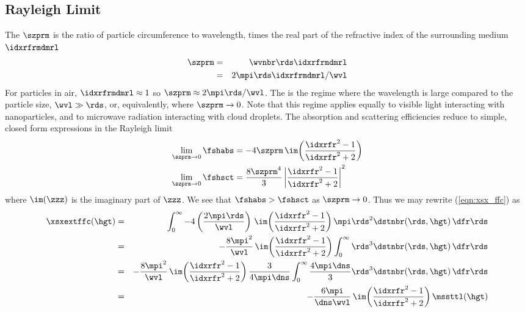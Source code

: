 \documentclass[12pt]{article}
\begin{document}
\subsection[Rayleigh Limit]{Rayleigh Limit}\label{sxn:ryl_lmt}
The  $\szprm$ is the ratio of particle
circumference to wavelength, times the real part of the refractive
index of the surrounding medium $\idxrfrmdmrl$
\begin{eqnarray}
\szprm & = & \wvnbr \rds \idxrfrmdmrl \\
& = & 2 \mpi \rds \idxrfrmdmrl / \wvl
\label{eqn:sz_prm_dfn}
\end{eqnarray}
For particles in air, $\idxrfrmdmrl \approx 1$ so 
$\szprm \approx 2\mpi\rds/\wvl$.
The  is the regime where the wavelength is
large compared to the particle size, $\wvl \gg \rds$, or,
equivalently, where $\szprm \rightarrow 0$.
Note that this regime applies equally to visible light interacting
with nanoparticles, and to microwave radiation interacting with cloud
droplets. 
The absorption and scattering efficiencies reduce to simple, closed
form expressions in the Rayleigh limit
\begin{subequations}
\label{eqn:ryl_lmt}
\begin{align}
\label{eqn:ryl_lmt_abs}
\lim_{\szprm\to 0} \fshabs & = -4\szprm \, \im \! \left( 
\frac{\idxrfr^{2}-1}{\idxrfr^{2}+2} \right) \\
\label{eqn:ryl_lmt_sct}
\lim_{\szprm\to 0} \fshsct & = \frac{8\szprm^{4}}{3}
\left| \frac{\idxrfr^{2}-1}{\idxrfr^{2}+2} \right|^{2}
\end{align}
\end{subequations} 
where $\im(\zzz)$ is the imaginary part of $\zzz$.
We see that $\fshabs > \fshsct$ as $\szprm\to 0$. 
Thus we may rewrite (\ref{eqn:xsx_ffc}) as
\begin{eqnarray}
\xsxextffc(\hgt) & = & \int_{0}^{\infty}
-4 \left( \frac{2\mpi \rds}{\wvl} \right) \, \im \! \left( 
\frac{\idxrfr^{2}-1}{\idxrfr^{2}+2} \right) 
\mpi \rds^{2} \dstnbr(\rds,\hgt) \,\dfr\rds \nonumber \\
& = &
-\frac{8\mpi^{2}}{\wvl} \, \im \! \left( 
\frac{\idxrfr^{2}-1}{\idxrfr^{2}+2} \right) 
 \int_{0}^{\infty} \rds^{3} \dstnbr(\rds,\hgt) \,\dfr\rds \nonumber \\
& = &
-\frac{8\mpi^{2}}{\wvl} \, \im \! \left( 
\frac{\idxrfr^{2}-1}{\idxrfr^{2}+2} \right) 
\frac{3}{4 \mpi \dns} \int_{0}^{\infty} 
\frac{4 \mpi \dns}{3} \rds^{3} \dstnbr(\rds,\hgt) \,\dfr\rds \nonumber \\
& = &
-\frac{6\mpi}{\dns \wvl} \, \im \! \left( 
\frac{\idxrfr^{2}-1}{\idxrfr^{2}+2} \right) 
\mssttl(\hgt)
\end{eqnarray} 
\end{document}
